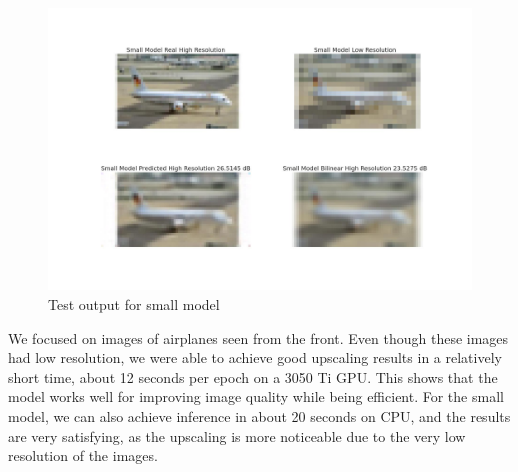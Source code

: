 \documentclass[../report.tex]{subfiles}
\begin{document}
\begin{figure}[H]
	\caption{Test output for small model}
	\centering
	\label{fig:test_small}
	\includegraphics[width=\textwidth]{../images/test_prediction_comparison_small_model.jpg}
\end{figure}
We focused on images of airplanes seen from the front. Even though these images had low resolution, we were able to achieve good upscaling results in a relatively short time, about 12 seconds per epoch on a 3050 Ti GPU. This shows that the model works well for improving image quality while being efficient.
For the small model, we can also achieve inference in about 20 seconds on CPU, and the results are very satisfying, as the upscaling is more noticeable due to the very low resolution of the images.
\end{document}
